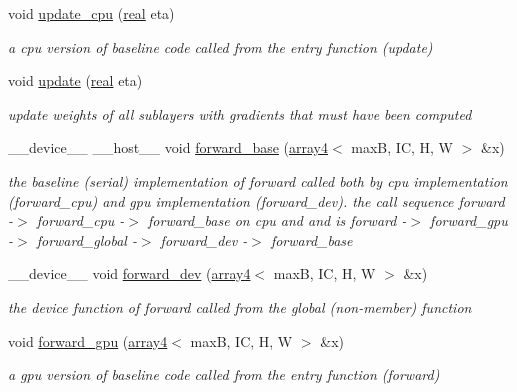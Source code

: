 \begin{DoxyCompactItemize}
void \hyperlink{structConvolution2D_a3768142c7d9dc9649b6afb1d2321449a}{update\+\_\+cpu} (\hyperlink{vgg__util_8h_a1082d08aaa761215ec83e7149f27ad16}{real} eta)
\begin{DoxyCompactList}\small\item\em a cpu version of baseline code called from the entry function (update) \end{DoxyCompactList}\item 
void \hyperlink{structConvolution2D_ac9fd666f96904bb7f62dc39cebae7a25}{update} (\hyperlink{vgg__util_8h_a1082d08aaa761215ec83e7149f27ad16}{real} eta)
\begin{DoxyCompactList}\small\item\em update weights of all sublayers with gradients that must have been computed \end{DoxyCompactList}\item 
\+\_\+\+\_\+device\+\_\+\+\_\+ \+\_\+\+\_\+host\+\_\+\+\_\+ void \hyperlink{structConvolution2D_aa969d35c6c2ca209354d3fd9249fcf82}{forward\+\_\+base} (\hyperlink{structarray4}{array4}$<$ maxB, IC, H, W $>$ \&x)
\begin{DoxyCompactList}\small\item\em the baseline (serial) implementation of forward called both by cpu implementation (forward\+\_\+cpu) and gpu implementation (forward\+\_\+dev). the call sequence forward -\/$>$ forward\+\_\+cpu -\/$>$ forward\+\_\+base on cpu and and is forward -\/$>$ forward\+\_\+gpu -\/$>$ forward\+\_\+global -\/$>$ forward\+\_\+dev -\/$>$ forward\+\_\+base \end{DoxyCompactList}\item 
\+\_\+\+\_\+device\+\_\+\+\_\+ void \hyperlink{structConvolution2D_a1e5d3b49b05f8444178be5f73f59bedd}{forward\+\_\+dev} (\hyperlink{structarray4}{array4}$<$ maxB, IC, H, W $>$ \&x)
\begin{DoxyCompactList}\small\item\em the device function of forward called from the global (non-\/member) function \end{DoxyCompactList}\item 
void \hyperlink{structConvolution2D_ac8bbdceed275bddaaf937e1b7ce2e5ac}{forward\+\_\+gpu} (\hyperlink{structarray4}{array4}$<$ maxB, IC, H, W $>$ \&x)
\begin{DoxyCompactList}\small\item\em a gpu version of baseline code called from the entry function (forward) \end{DoxyCompactList}\item 

\end{DoxyCompactItemize}
